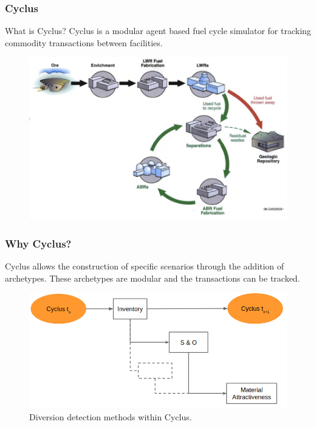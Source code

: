 \begin{frame}
	\frametitle{Cyclus}
	\begin{block}{What is Cyclus?}
		Cyclus is a modular agent based fuel cycle simulator for tracking commodity transactions
		between facilities.
	\end{block}
	\begin{figure}
		\centering
		\includegraphics[width=0.7\linewidth]{lanl-fuel-cycle.png}
	\end{figure}
\end{frame}

\begin{frame}
	\frametitle{Why Cyclus?}
	Cyclus allows the construction of specific scenarios through the addition of archetypes. These archetypes are
	modular and the transactions can be tracked.
	\begin{figure}
		\centering
		\includegraphics[width=0.9\linewidth]{diversion1}
		\caption{Diversion detection methods within Cyclus.}
		\label{fig:diversion}
	\end{figure}
\end{frame}

